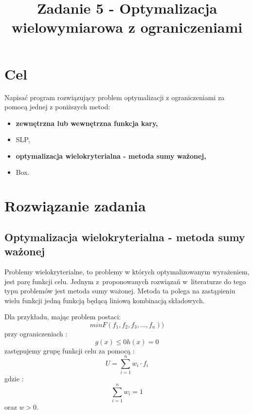 \documentclass{classrep}
\author{
  \studentinfo{Paweł Musiał}{178726} \and
  \studentinfo{Łukasz Michalski}{178724}
}
\title{Zadanie 5 - Optymalizacja wielowymiarowa z ograniczeniami}
\begin{document}
\maketitle

\section{Cel}

Napisać program rozwiązujący problem optymalizacji z ograniczeniami za pomocą jednej z poniższych metod:
\begin{itemize}
\item \textbf{zewnętrzna lub wewnętrzna funkcja kary,}
\item SLP,
\item \textbf{optymalizacja wielokryterialna - metoda sumy ważonej,}
\item Box.
\end{itemize}


\section{Rozwiązanie zadania}

\subsection{Optymalizacja wielokryterialna - metoda sumy ważonej}

Problemy wielokryterialne, to problemy w których optymalizowanym wyrażeniem, jest parę funkcji celu. Jednym z~proponowanych rozwiązań w~literaturze \cite{2} do tego typu problemów jest metoda sumy ważonej. Metoda ta polega na zastąpieniu wielu funkcji jedną funkcją będącą liniową kombinacją składowych.

\noindent Dla przykładu, mając problem postaci:
\begin{equation}
min F(f_1, f_2, f_3, \dots, f_n))
\end{equation}
\noindent przy ograniczeniach :
\begin{equation*}
g(x) \leq 0
h(x) = 0
\end{equation*}
zastępujemy grupę funkcji celu za pomocą :
\begin{equation}
U = \sum \limits ^{n} _{i=1} w_i \cdot f_i
\end{equation}
\noindent gdzie : 
\begin{equation*}
\sum \limits ^{n} _{i=1} w_i = 1
\end{equation*}
oraz $w>0$.
\end{document}
